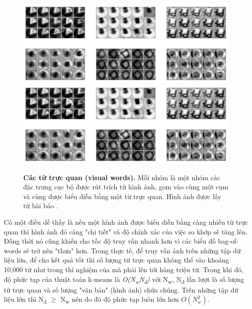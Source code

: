 \begin{figure}[!htbp]
  \begin{center}
    \leavevmode
    \ifpdf
      \includegraphics[scale=0.32]{visualWords}
    \else
      \includegraphics[scale=0.32]{visualWords}
    \fi
    \caption[Các từ trực quan (visual words)]{\textbf{Các từ trực quan (visual words).} Mỗi nhóm là một nhóm các đặc trưng cục bộ được rút trích từ hình ảnh, gom vào cùng một cụm và cùng được biểu diễn bằng một từ trực quan. Hình ảnh được lấy từ bài báo \citep{sivic2009efficient}.}
    \label{FigVisualWords}
  \end{center}
\end{figure}

Có một điều dễ thấy là nếu một hình ảnh được biểu diễn bằng càng nhiều từ trực quan thì hình ảnh đó càng "chi tiết" và độ chính xác của việc so khớp sẽ tăng lên. Đồng thời nó cũng khiến cho tốc độ truy vấn nhanh hơn vì các biểu đồ bag-of-words sẽ trở nên "thưa" hơn. Trong thực tế, để truy vấn ảnh trên những tập dữ liệu lớn, để cho kết quả tốt thì số lượng từ trực quan không thể vào khoảng 10,000 từ như trong thí nghiệm của \cite{sivic2003video} mà phải lên tới hàng triệu từ. Trong khi đó, độ phức tạp của thuật toán k-means là \textit{O(N\textsubscript{w}N\textsubscript{d})} với N\textsubscript{w}, N\textsubscript{d} lần lượt là số lượng từ trực quan và số lượng "văn bản" (hình ảnh) chứa chúng. Trên những tập dữ liệu lớn thì N\textsubscript{d} $\geq$ N\textsubscript{w} nên do đó độ phức tạp luôn lớn hơn $O(N^2_w)$.



